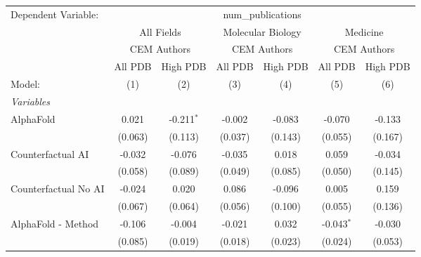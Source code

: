 \begingroup
\centering
\begin{tabular}{lcccccc}
   \tabularnewline \midrule \midrule
   Dependent Variable: & \multicolumn{6}{c}{num\_publications}\\
 & \multicolumn{2}{c}{All Fields} & \multicolumn{2}{c}{Molecular Biology} & \multicolumn{2}{c}{Medicine} \\
\cmidrule(lr){2-3} \cmidrule(lr){4-5} \cmidrule(lr){6-7}
 & \multicolumn{2}{c}{CEM Authors} & \multicolumn{2}{c}{CEM Authors} & \multicolumn{2}{c}{CEM Authors} \\
\cmidrule(lr){2-3} \cmidrule(lr){4-5} \cmidrule(lr){6-7}
 & \multicolumn{1}{c}{All PDB} & \multicolumn{1}{c}{High PDB} & \multicolumn{1}{c}{All PDB} & \multicolumn{1}{c}{High PDB} & \multicolumn{1}{c}{All PDB} & \multicolumn{1}{c}{High PDB} \\
\cmidrule(lr){2-2} \cmidrule(lr){3-3} \cmidrule(lr){4-4} \cmidrule(lr){5-5} \cmidrule(lr){6-6} \cmidrule(lr){7-7}
   Model:                                                     & (1)     & (2)          & (3)            & (4)          & (5)          & (6)\\  
   \midrule
   \emph{Variables}\\
   AlphaFold                                                  & 0.021   & -0.211$^{*}$ & -0.002         & -0.083       & -0.070       & -0.133\\   
                                                              & (0.063) & (0.113)      & (0.037)        & (0.143)      & (0.055)      & (0.167)\\   
   Counterfactual AI                                          & -0.032  & -0.076       & -0.035         & 0.018        & 0.059        & -0.034\\   
                                                              & (0.058) & (0.089)      & (0.049)        & (0.085)      & (0.050)      & (0.145)\\   
   Counterfactual No AI                                       & -0.024  & 0.020        & 0.086          & -0.096       & 0.005        & 0.159\\   
                                                              & (0.067) & (0.064)      & (0.056)        & (0.100)      & (0.055)      & (0.136)\\   
   AlphaFold - Method                                         & -0.106  & -0.004       & -0.021         & 0.032        & -0.043$^{*}$ & -0.030\\   
                                                              & (0.085) & (0.019)      & (0.018)        & (0.023)      & (0.024)      & (0.053)\\   

\end{tabular}
